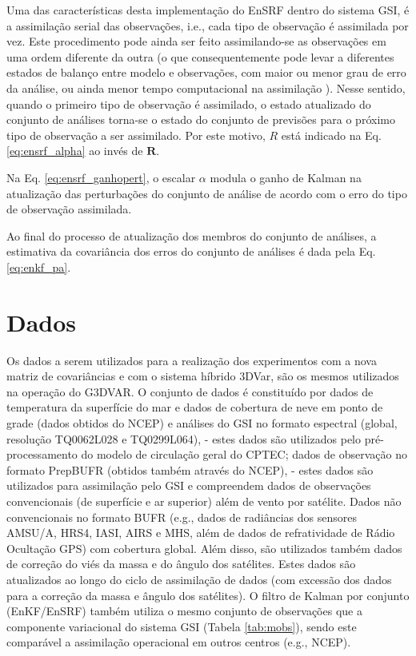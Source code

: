 Uma das características desta implementação do EnSRF dentro do sistema GSI, é a assimilação serial das observações, i.e., cada tipo de observação é assimilada por vez. Este procedimento pode ainda ser feito assimilando-se as observações em uma ordem diferente da outra (o que consequentemente pode levar a diferentes estados de balanço entre modelo e observações, com maior ou menor grau de erro da análise, ou ainda menor tempo computacional na assimilação ). Nesse sentido, quando o primeiro tipo de observação é assimilado, o estado atualizado do conjunto de análises torna-se o estado do conjunto de previsões para o próximo tipo de observação a ser assimilado. Por este motivo, $R$ está indicado na Eq. \ref{eq:ensrf_alpha} ao invés de $\mathbf{R}$.

Na Eq. \ref{eq:ensrf_ganhopert}, o escalar $\alpha$ modula o ganho de Kalman na atualização das perturbações do conjunto de análise de acordo com o erro do tipo de observação assimilada.

Ao final do processo de atualização dos membros do conjunto de análises, a estimativa da covariância dos erros do conjunto de análises é dada pela Eq. \ref{eq:enkf_pa}.

\section{Dados} 

Os dados a serem utilizados para a realização dos experimentos com a nova matriz de covariâncias e com o sistema híbrido 3DVar, são os mesmos utilizados na operação do G3DVAR. O conjunto de dados é constituído por dados de temperatura da superfície do mar e dados de cobertura de neve em ponto de grade (dados obtidos do NCEP) e análises do GSI no formato espectral (global, resolução TQ0062L028 e TQ0299L064), - estes dados são utilizados pelo pré-processamento do modelo de circulação geral do CPTEC; dados de observação no formato PrepBUFR (obtidos também através do NCEP), - estes dados são utilizados para assimilação pelo GSI e compreendem dados de observações convencionais (de superfície e ar superior) além de vento por satélite. Dados não convencionais no formato BUFR (e.g., dados de radiâncias dos sensores AMSU/A, HRS4, IASI, AIRS e MHS, além de dados de refratividade de Rádio Ocultação GPS) com cobertura global. Além disso, são utilizados também dados de correção do viés da massa e do ângulo dos satélites. Estes dados são atualizados ao longo do ciclo de assimilação de dados (com excessão dos dados para a correção da massa e ângulo dos satélites). O filtro de Kalman por conjunto (EnKF/EnSRF) também utiliza o mesmo conjunto de observações que a componente variacional do sistema GSI (Tabela \ref{tab:mobs}), sendo este comparável a assimilação operacional em outros centros (e.g., NCEP).

